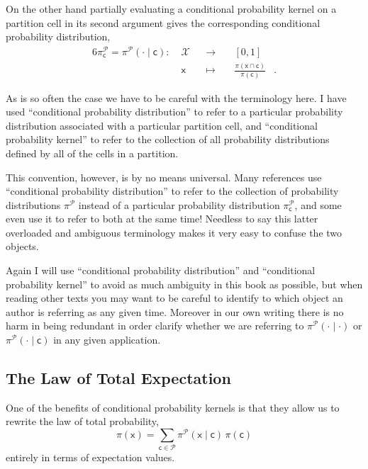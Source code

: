 \documentclass[
  letterpaper,
  DIV=11,
  numbers=noendperiod]{scrartcl}
\begin{document}
On the other hand partially evaluating a conditional probability kernel
on a partition cell in its second argument gives the corresponding
conditional probability distribution, \begin{alignat*}{6}
\pi^{\mathcal{P}}_{\mathsf{c}}
=
\pi^{\mathcal{P}}( \cdot \mid \mathsf{c} )
:\; &\mathcal{X}& &\rightarrow& \; &[0, 1]&
\\
&\mathsf{x}& &\mapsto&
&\frac{ \pi(\mathsf{x} \cap \mathsf{c}) }{ \pi (\mathsf{c}) }&.
\end{alignat*}

As is so often the case we have to be careful with the terminology here.
I have used ``conditional probability distribution'' to refer to a
particular probability distribution associated with a particular
partition cell, and ``conditional probability kernel'' to refer to the
collection of all probability distributions defined by all of the cells
in a partition.

This convention, however, is by no means universal. Many references use
``conditional probability distribution'' to refer to the collection of
probability distributions \(\pi^{\mathcal{P}}\) instead of a particular
probability distribution \(\pi^{\mathcal{P}}_{\mathsf{c}}\), and some
even use it to refer to both at the same time! Needless to say this
latter overloaded and ambiguous terminology makes it very easy to
confuse the two objects.

Again I will use ``conditional probability distribution'' and
``conditional probability kernel'' to avoid as much ambiguity in this
book as possible, but when reading other texts you may want to be
careful to identify to which object an author is referring as any given
time. Moreover in our own writing there is no harm in being redundant in
order clarify whether we are referring to
\(\pi^{\mathcal{P}}( \cdot \mid \cdot )\) or
\(\pi^{\mathcal{P}}( \cdot \mid \mathsf{c} )\) in any given application.

\subsection{The Law of Total
Expectation}\label{the-law-of-total-expectation}

One of the benefits of conditional probability kernels is that they
allow us to rewrite the law of total probability, \[
\pi( \mathsf{x} )
=
\sum_{ \mathsf{c} \in \mathcal{P} }
\pi^{\mathcal{P}}( \mathsf{x} \mid \mathsf{c} ) \, \pi( \mathsf{c} )
\] entirely in terms of expectation values.
\end{document}
